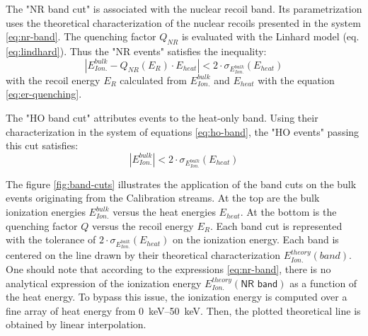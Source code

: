 The "NR band cut" is associated with the nuclear recoil band. Its parametrization uses the theoretical characterization of the nuclear recoils presented in the system \ref{eq:nr-band}. The quenching factor $Q_{NR}$ is evaluated with the Linhard model (eq. \ref{eq:lindhard}). Thus the "NR events" satisfies the inequality:
\begin{equation}
\label{eq:condition-NR-ecei}
|E_{Ion.}^{bulk} - Q_{NR} \left( E_{R} \right) \cdot E_{heat}| < 2 \cdot \sigma_{E_{Ion.}^{bulk}} \left( E_{heat}\right)
\end{equation}
with the recoil energy $E_R$ calculated from $E_{Ion.}^{bulk}$ and $E_{heat}$ with the equation \ref{eq:er-quenching}.

The "HO band cut" attributes events to the heat-only band. Using their characterization in the system of equations \ref{eq:ho-band}, the "HO events" passing this cut satisfies:
\begin{equation}
|E_{Ion.}^{bulk}| < 2 \cdot \sigma_{E_{Ion.}^{bulk}} \left( E_{heat}\right)
\end{equation}

The figure \ref{fig:band-cuts} illustrates the application of the band cuts on the bulk events originating from the Calibration streams. At the top are the bulk ionization energies $E_{Ion.}^{bulk}$ versus the heat energies $E_{heat}$. At the bottom is the quenching factor $Q$ versus the recoil energy $E_R$. Each band cut is represented with the tolerance of $2 \cdot \sigma_{E_{Ion.}^{bulk}} \left( E_{heat}\right)$ on the ionization  energy. Each band is centered on the line drawn by their theoretical characterization $E_{Ion.}^{theory}(band)$.
One should note that according to the expressions \ref{eq:nr-band}, there is no analytical expression of the ionization energy $E_{Ion.}^{theory}(\textsf{NR band})$ as a function of the heat energy. To bypass this issue, the ionization energy is computed over a fine array of heat energy from \SIrange{0}{50}{\kilo\eV}. Then, the plotted theoretical line is obtained by linear interpolation.


